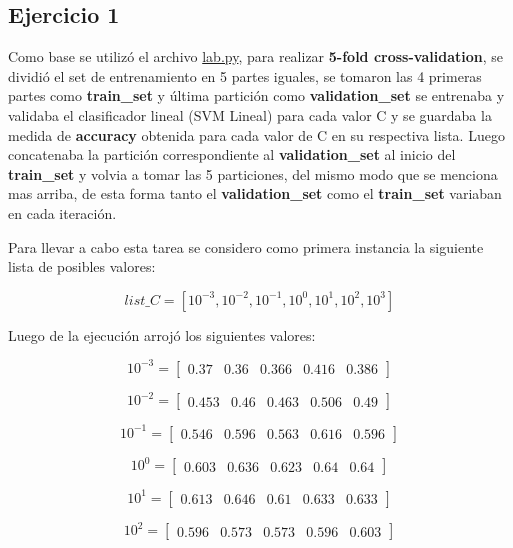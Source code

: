 \documentclass[11pt, spanish, a4paper]{article}
\begin{document}
\subsection{Ejercicio 1}
\label{ejercicio1}
Como base se utilizó el archivo \href{https://drive.google.com/file/d/0B6mRi0ta2K1rRmRmRUlTblNzX0k/view?usp=sharing}{lab.py}, para realizar \textbf{5-fold cross-validation}, se dividió el set de entrenamiento en 5 partes iguales, se tomaron las 4 primeras partes como \textbf{train\_set} y última partición como \textbf{validation\_set} se entrenaba y validaba el clasificador lineal (SVM Lineal) para cada valor C y se guardaba la medida de \textbf{accuracy} obtenida para cada valor de C en su respectiva lista. Luego concatenaba la partición correspondiente al \textbf{validation\_set} al inicio del \textbf{train\_set} y volvia a tomar las 5 particiones, del mismo modo que se menciona mas arriba, de esta forma tanto el \textbf{validation\_set} como el \textbf{train\_set} variaban en cada iteración.

Para llevar a cabo esta tarea se considero como primera instancia la siguiente lista de posibles valores:

$$list\_C = [10^{-3}, 10^{-2}, 10^{-1}, 10^0, 10^1, 10^2, 10^3]$$

Luego de la ejecución arrojó los siguientes valores:

\[
10^{-3}=
  \begin{bmatrix}
	0.37 & 0.36 & 0.366 & 0.416 & 0.386
  \end{bmatrix}
\]

\[
10^{-2}=
  \begin{bmatrix}
	0.453 & 0.46 & 0.463 & 0.506 & 0.49
  \end{bmatrix}
\]

\[
10^{-1}=
  \begin{bmatrix}
	0.546 & 0.596 & 0.563 & 0.616 & 0.596
  \end{bmatrix}
\]

\[
10^{0}=
  \begin{bmatrix}
	0.603 & 0.636 & 0.623 & 0.64 & 0.64
  \end{bmatrix}
\]

\[
10^{1}=
  \begin{bmatrix}
	0.613 & 0.646 & 0.61 & 0.633 & 0.633
  \end{bmatrix}
\]

\[
10^{2}=
  \begin{bmatrix}
	0.596 & 0.573 & 0.573 & 0.596 & 0.603
  \end{bmatrix}
\]
\end{document}
